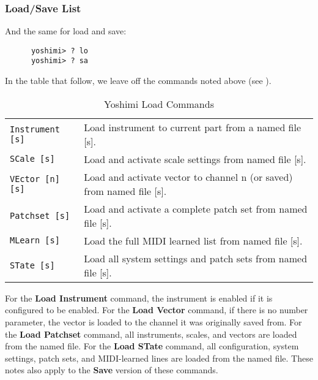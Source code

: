 %

\subsubsection{Load/Save List}
\label{subsec:command_line_loadsave_list}

   And the same for load and save:

   \begin{verbatim}
      yoshimi> ? lo
      yoshimi> ? sa
   \end{verbatim}

   In the table that follow, we leave off the commands noted above
   (see ).

   \begin{table}[H]
      \centering
      \caption{Yoshimi Load Commands}
      \label{table:yoshimi_text_load_commands}
      \begin{tabular}{l l}

\texttt{Instrument [s]} &
   Load instrument to current part from a named file [s]. \\
\texttt{SCale [s]} &
   Load and activate scale settings from named file [s]. \\
\texttt{VEctor [n] [s]} &
   Load and activate vector to channel n (or saved) from named file [s]. \\
\texttt{Patchset [s]} &
   Load and activate a complete patch set from named file [s]. \\
\texttt{MLearn [s]} &
   Load the full MIDI learned list from named file [s]. \\
\texttt{STate [s]} &
   Load all system settings and patch sets from named file [s]. \\

      \end{tabular}
   \end{table}

   For the \textbf{Load Instrument} command, the instrument is enabled if it is
   configured to be enabled.  For the \textbf{Load Vector} command, if there is
   no number parameter, the vector is loaded to the channel it was originally
   saved from.
   For the \textbf{Load Patchset} command, all instruments, scales, and vectors
   are loaded from the named file.
   For the \textbf{Load STate} command, all configuration, system settings,
   patch sets, and MIDI-learned lines are loaded from the named file.
   These notes also apply to the \textbf{Save} version of these commands.

